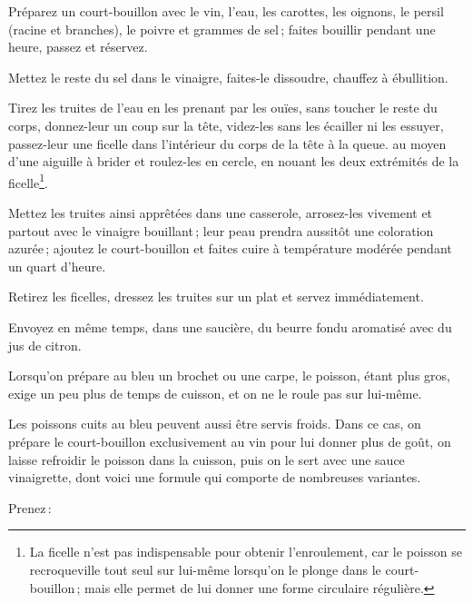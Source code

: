 Préparez un court-bouillon avec le vin, l’eau, les carottes, les oignons, le
persil (racine et branches), le poivre et {\mmm} grammes de sel ; faites
bouillir pendant une heure, passez et réservez.

Mettez le reste du sel dans le vinaigre, faites-le dissoudre, chauffez
à ébullition.

Tirez les truites de l'eau en les prenant par les ouïes, sans toucher le reste
du corps, donnez-leur un coup sur la tête, videz-les sans les écailler ni les
essuyer, passez-leur une ficelle dans l'intérieur du corps de la tête à la
queue. au moyen d'une aiguille à brider et roulez-les en cercle, en nouant les
deux extrémités de la ficelle\footnote{La ficelle n’est pas indispensable pour
obtenir l’enroulement, car le poisson se recroqueville tout seul sur lui-même
lorsqu'on le plonge dans le court-bouillon ; mais elle permet de lui donner une
forme circulaire régulière.}.

Mettez les truites ainsi apprêtées dans une casserole, arrosez-les vivement et
partout avec le vinaigre bouillant ; leur peau prendra aussitôt une coloration
azurée ; ajoutez le court-bouillon et faites cuire à température modérée
pendant un quart d'heure.

Retirez les ficelles, dressez les truites sur un plat et servez immédiatement.

Envoyez en même temps, dans une saucière, du beurre fondu aromatisé avec
du jus de citron.

\sk

Lorsqu'on prépare au bleu un brochet ou une carpe, le poisson, étant plus gros,
exige un peu plus de temps de cuisson, et on ne le roule pas sur lui-même.

\sk

Les poissons cuits au bleu peuvent aussi être servis froids. Dans ce cas, on
prépare le court-bouillon exclusivement au vin pour lui donner plus de goût, on
laisse refroidir le poisson dans la cuisson, puis on le sert avec une sauce
vinaigrette, dont voici une formule qui comporte de nombreuses variantes.

\medskip

Prenez :


